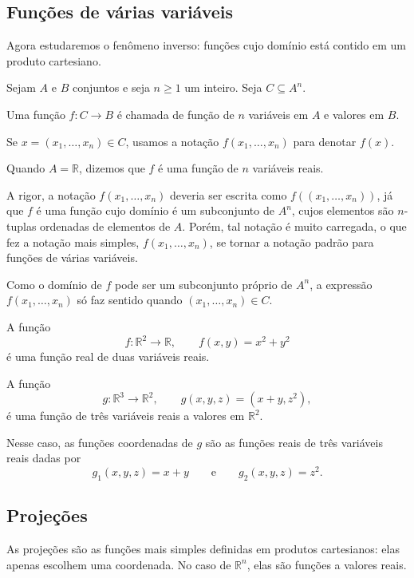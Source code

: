 \subsection{Funções de várias variáveis}

Agora estudaremos o fenômeno inverso: funções cujo domínio está contido em um produto cartesiano.

\begin{definition}
    Sejam $A$ e $B$ conjuntos e seja $n\geq 1$ um inteiro.
    Seja $C\subseteq A^n$.

    Uma função $f:C\to B$
    é chamada de função de $n$ variáveis em $A$ e valores em $B$.

    Se $x=(x_1,\ldots,x_n)\in C$, usamos a notação $f(x_1,\ldots,x_n)$ para denotar $f(x)$.
    
    Quando $A=\mathbb R$, dizemos que $f$ é uma função de $n$ variáveis reais.
\end{definition}

A rigor, a notação $f(x_1, \dots, x_n)$ deveria ser escrita como $f((x_1, \dots, x_n))$, já que $f$ é uma função cujo domínio é um subconjunto de $A^n$, cujos elementos são $n$-tuplas ordenadas de elementos de $A$.
Porém, tal notação é muito carregada, o que fez a notação mais simples, $f(x_1, \dots, x_n)$, se tornar a notação padrão para funções de várias variáveis.

Como o domínio de $f$ pode ser um subconjunto próprio de $A^n$, a expressão $f(x_1,\ldots,x_n)$ só faz sentido quando $(x_1,\ldots,x_n)\in C$.

\begin{example}
    A função
    \[
        f:\mathbb R^2\to\mathbb R,
        \qquad
        f(x,y)=x^2+y^2
    \]
    é uma função real de duas variáveis reais.

    A função
    \[
        g:\mathbb R^3\to\mathbb R^2,
        \qquad
        g(x,y,z)=(x+y,z^2),
    \]
    é uma função de três variáveis reais a valores em $\mathbb R^2$.

    Nesse caso, as funções coordenadas de $g$ são as funções reais de três variáveis reais dadas por
    \[
        g_1(x,y,z)=x+y
        \qquad\text{e}\qquad
        g_2(x,y,z)=z^2.
    \]
\end{example}
\subsection{Projeções}

As projeções são as funções mais simples definidas em produtos cartesianos: elas apenas escolhem uma coordenada.
No caso de $\mathbb R^n$, elas são funções a valores reais.


